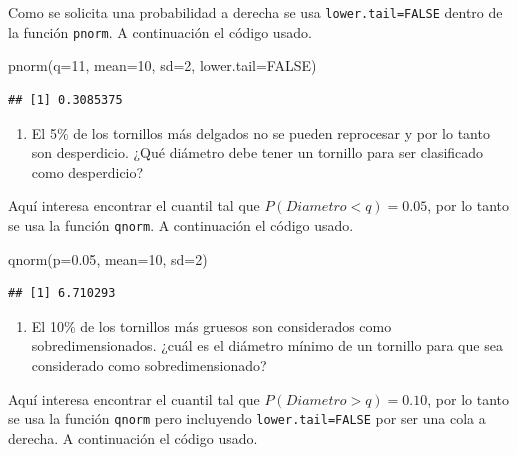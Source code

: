 \documentclass[
]{book}
\makeatletter
\newenvironment{Shaded}{\begin{snugshade}}{\end{snugshade}}
\newcommand{\AttributeTok}[1]{\textcolor[rgb]{0.77,0.63,0.00}{#1}}
\newcommand{\ConstantTok}[1]{\textcolor[rgb]{0.00,0.00,0.00}{#1}}
\newcommand{\DecValTok}[1]{\textcolor[rgb]{0.00,0.00,0.81}{#1}}
\newcommand{\FloatTok}[1]{\textcolor[rgb]{0.00,0.00,0.81}{#1}}
\newcommand{\FunctionTok}[1]{\textcolor[rgb]{0.00,0.00,0.00}{#1}}
\newcommand{\NormalTok}[1]{#1}
\providecommand{\tightlist}{%
  \setlength{\itemsep}{0pt}\setlength{\parskip}{0pt}}
\newenvironment{kframe}{%
\medskip{}
\setlength{\fboxsep}{.8em}
 \def\at@end@of@kframe{}%
 \ifinner\ifhmode%
  \def\at@end@of@kframe{\end{minipage}}%
  \begin{minipage}{\columnwidth}%
 \fi\fi%
 \def\FrameCommand##1{\hskip\@totalleftmargin \hskip-\fboxsep
 \colorbox{shadecolor}{##1}\hskip-\fboxsep
     \hskip-\linewidth \hskip-\@totalleftmargin \hskip\columnwidth}%
 \MakeFramed {\advance\hsize-\width
   \@totalleftmargin\z@ \linewidth\hsize
   \@setminipage}}%
 {\par\unskip\endMakeFramed%
 \at@end@of@kframe}
\renewenvironment{Shaded}{\begin{kframe}}{\end{kframe}}
\makeatother
\begin{document}
Como se solicita una probabilidad a derecha se usa \texttt{lower.tail=FALSE} dentro de la función \texttt{pnorm}. A continuación el código usado.

\begin{Shaded}
\begin{Highlighting}[]
\FunctionTok{pnorm}\NormalTok{(}\AttributeTok{q=}\DecValTok{11}\NormalTok{, }\AttributeTok{mean=}\DecValTok{10}\NormalTok{, }\AttributeTok{sd=}\DecValTok{2}\NormalTok{, }\AttributeTok{lower.tail=}\ConstantTok{FALSE}\NormalTok{)}
\end{Highlighting}
\end{Shaded}

\begin{verbatim}
## [1] 0.3085375
\end{verbatim}

\begin{enumerate}
\def\labelenumi{\arabic{enumi})}
\setcounter{enumi}{2}
\tightlist
\item
  El 5\% de los tornillos más delgados no se pueden reprocesar y por lo tanto son desperdicio. ¿Qué diámetro debe tener un tornillo para ser clasificado como desperdicio?
\end{enumerate}

Aquí interesa encontrar el cuantil tal que \(P(Diametro<q)=0.05\), por lo tanto se usa la función \texttt{qnorm}. A continuación el código usado.

\begin{Shaded}
\begin{Highlighting}[]
\FunctionTok{qnorm}\NormalTok{(}\AttributeTok{p=}\FloatTok{0.05}\NormalTok{, }\AttributeTok{mean=}\DecValTok{10}\NormalTok{, }\AttributeTok{sd=}\DecValTok{2}\NormalTok{)}
\end{Highlighting}
\end{Shaded}

\begin{verbatim}
## [1] 6.710293
\end{verbatim}

\begin{enumerate}
\def\labelenumi{\arabic{enumi})}
\setcounter{enumi}{3}
\tightlist
\item
  El 10\% de los tornillos más gruesos son considerados como sobredimensionados. ¿cuál es el diámetro mínimo de un tornillo para que sea considerado como sobredimensionado?
\end{enumerate}

Aquí interesa encontrar el cuantil tal que \(P(Diametro>q)=0.10\), por lo tanto se usa la función \texttt{qnorm} pero incluyendo \texttt{lower.tail=FALSE} por ser una cola a derecha. A continuación el código usado.
\end{document}
